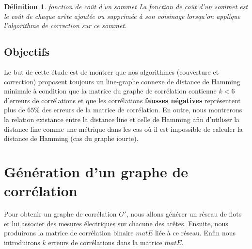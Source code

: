 \documentclass[onecolumn, 12pt]{book}
\newtheorem{definition}{D\'efinition}
\begin{document}
\begin{definition}{ fonction de co\^ut d'un sommet} \newline
La fonction de co\^ut d'un sommet est le co\^ut de chaque ar\^ete ajout\'ee ou supprim\'ee \`a son voisinage lorsqu'on applique l'algorithme de correction sur ce sommet.
\end{definition}

\subsection{Objectifs}
Le but de cette \'etude est de montrer que nos algorithmes (couverture et correction) proposent
toujours un line-graphe connexe de distance de Hamming minimale 
\`a condition que la matrice du graphe de corr\'elation contienne $k<6$ d'erreurs de corr\'elations
et que les corr\'elations {\bf fausses n\'egatives} repr\'esentent plus de $65\%$ des erreurs de la matrice de corr\'elation.
En outre, nous montrerons la relation existance entre la distance line et celle de Hamming afin d'utiliser la distance line comme une m\'etrique dans les cas o\`u il est impossible de calculer la distance de Hamming (cas du graphe iourte).

\section{G\'en\'eration d'un graphe de corr\'elation}
\label{generationReseauxFlots}
Pour obtenir un graphe de corr\'elation $G'$, nous allons g\'en\'erer un r\'eseau de flots et   lui associer des mesures \'electriques sur chacune des ar\^etes. Ensuite, nous produirons la matrice de  corr\'elation binaire $matE$ li\'ee \`a ce r\'eseau. Enfin nous introduirons $k$ erreurs de corr\'elations dans la matrice $matE$.
\end{document}
